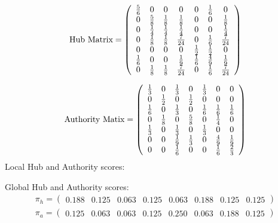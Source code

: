 \documentclass[11pt]{report}
\begin{document}
\begin{equation}
\textnormal{Hub Matrix}=\left(
\begin{array}{ccccccc}
\frac{5}{6} & 0 & 0 & 0 & 0 & \frac{1}{6} & 0 \\
0 & \frac{5}{8} & \frac{1}{8} & \frac{1}{8} & 0 & 0 & \frac{1}{8} \\
0 & \frac{1}{4} & \frac{1}{4} & \frac{1}{4} & 0 & 0 & \frac{1}{4} \\
0 & \frac{1}{8} & \frac{1}{8} & \frac{7}{24} & 0 & \frac{1}{6} & \frac{7}{24} \\
0 & 0 & 0 & 0 & \frac{1}{2} & \frac{1}{2} & 0\\
\frac{1}{6} & 0 & 0 & \frac{1}{9} & \frac{1}{6} & \frac{4}{9} & \frac{1}{9} \\
0 & \frac{1}{8} & \frac{1}{8} & \frac{7}{24} & 0 & \frac{1}{6} & \frac{7}{24} \\
\end{array}
\right)
\end{equation}

\begin{equation}
\textnormal{Authority Matix}=\left(
\begin{array}{ccccccc}
\frac{1}{3} & 0 & \frac{1}{3} & 0 & \frac{1}{3} & 0 & 0 \\
0 & \frac{1}{2} & 0 & \frac{1}{2} & 0 & 0 & 0 \\
\frac{1}{6} & 0 & \frac{1}{3} & 0 & \frac{1}{6} & \frac{1}{6} & \frac{1}{6} \\
0 & \frac{1}{8} & 0 & \frac{5}{8} & 0 & \frac{1}{4} & 0 \\
\frac{1}{3} & 0 & \frac{1}{3} & 0 & \frac{1}{3} & 0 & 0 \\
0 & 0 & \frac{1}{9} & \frac{1}{3} & 0 & \frac{4}{9} & \frac{1}{9} \\
0 & 0 & \frac{1}{6} & 0 & 0 & \frac{1}{6} & \frac{2}{3} \\
\end{array}
\right)
\end{equation}
Local Hub and Authority scores:


Global Hub and Authority scores:
\begin{eqnarray}
\pi_h = \left( \begin{array} {cccccccc}
0.188 & 0.125 & 0.063 & 0.125 & 0.063 & 0.188 & 0.125 & 0.125
\end{array}\right) \\
\pi_a = \left( \begin{array} {cccccccc}
0.125 & 0.063 & 0.063 & 0.125 & 0.250 & 0.063 & 0.188 & 0.125
\end{array}\right)
\end{eqnarray}
\end{document}
